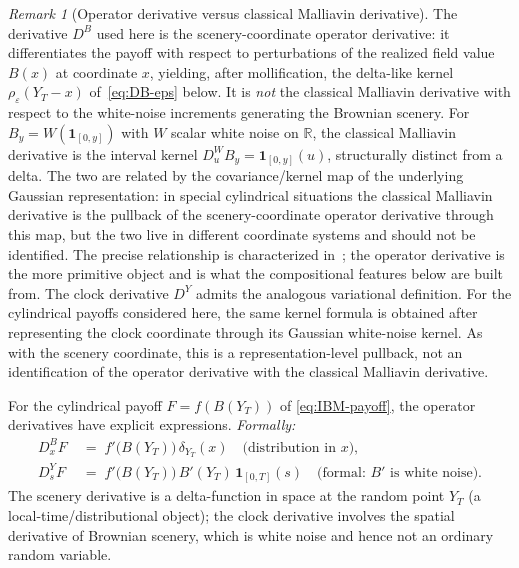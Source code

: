 \documentclass[11pt,reqno]{amsart}
\theoremstyle{plain}
\theoremstyle{definition}
\theoremstyle{remark}
\newtheorem{remark}[theorem]{Remark}
\newcommand{\R}{\mathbb R}
\newcommand{\Bvar}{B}
\newcommand{\Yclock}{Y}
\begin{document}
\begin{remark}[Operator derivative versus classical Malliavin
derivative]\label{rem:operator-vs-malliavin}
The derivative $D^{\Bvar}$ used here is the scenery-coordinate
operator derivative: it differentiates the payoff with respect
to perturbations of the realized field value $\Bvar(x)$ at
coordinate $x$, yielding, after mollification, the delta-like
kernel $\rho_{\varepsilon}(\Yclock_{T}-x)$
of~\eqref{eq:DB-eps} below. It is \emph{not} the classical
Malliavin derivative with respect to the white-noise increments
generating the Brownian scenery. For $\Bvar_{y}=W(\mathbf
1_{[0,y]})$ with $W$ scalar white noise on $\R$, the classical
Malliavin derivative is the interval kernel $D^{W}_{u}\Bvar_{y}
=\mathbf 1_{[0,y]}(u)$, structurally distinct from a delta. The
two are related by the covariance/kernel map of the underlying
Gaussian representation: in special cylindrical situations the
classical Malliavin derivative is the pullback of the
scenery-coordinate operator derivative through this map, but
the two live in different coordinate systems and should not be
identified. The precise relationship is characterized
in~\cite{OperatorClarkOcone}; the operator derivative is the
more primitive object and is what the compositional features
below are built from. The clock derivative $D^{\Yclock}$ admits the analogous variational
definition. For the cylindrical payoffs considered here, the same
kernel formula is obtained after representing the clock coordinate
through its Gaussian white-noise kernel. As with the scenery
coordinate, this is a representation-level pullback, not an
identification of the operator derivative with the classical
Malliavin derivative.
\end{remark}

For the cylindrical payoff $F=f(\Bvar(\Yclock_{T}))$ of
\eqref{eq:IBM-payoff}, the operator derivatives have explicit
expressions. \emph{Formally:}
\begin{align}
  D^{\Bvar}_{x}F
  &\;=\;f'\bigl(\Bvar(\Yclock_{T})\bigr)\,\delta_{\Yclock_{T}}(x)
   \quad\text{(distribution in $x$)},
   \label{eq:DB-formal}\\
  D^{\Yclock}_{s}F
  &\;=\;f'\bigl(\Bvar(\Yclock_{T})\bigr)\,\Bvar'(\Yclock_{T})\,\mathbf 1_{[0,T]}(s)
   \quad\text{(formal: $\Bvar'$ is white noise)}.
   \label{eq:DY-formal}
\end{align}
The scenery derivative is a delta-function in space at the
random point $\Yclock_{T}$ (a local-time/distributional
object); the clock derivative involves the spatial derivative
of Brownian scenery, which is white noise and hence not an
ordinary random variable.
\end{document}
